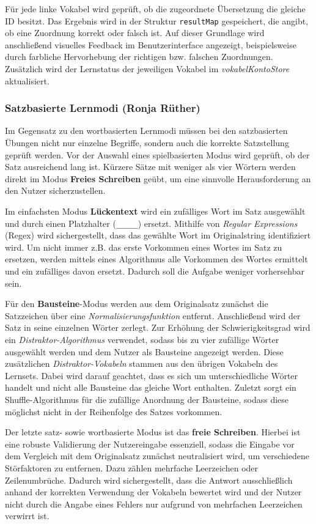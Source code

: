 Für jede linke Vokabel wird geprüft, ob die zugeordnete Übersetzung die gleiche ID besitzt. 
Das Ergebnis wird in der Struktur \texttt{resultMap} gespeichert, die angibt, ob eine Zuordnung korrekt oder falsch ist. 
Auf dieser Grundlage wird anschließend visuelles Feedback im Benutzerinterface angezeigt, beispielsweise durch farbliche Hervorhebung der richtigen bzw. falschen Zuordnungen.
Zusätzlich wird der Lernstatus der jeweiligen Vokabel im \textit{vokabelKontoStore} aktualisiert. 

\subsubsection{Satzbasierte Lernmodi (Ronja Rüther)}
Im Gegensatz zu den wortbasierten Lernmodi müssen bei den satzbasierten Übungen nicht nur einzelne Begriffe, sondern auch die korrekte Satzstellung geprüft werden.
Vor der Auswahl eines spielbasierten Modus wird geprüft, ob der Satz ausreichend lang ist. Kürzere Sätze mit weniger als vier Wörtern werden direkt im Modus \textbf{Freies Schreiben} geübt, um eine sinnvolle Herausforderung an den Nutzer sicherzustellen.

Im einfachsten Modus \textbf{Lückentext} wird ein zufälliges Wort im Satz ausgewählt und durch einen Platzhalter (\texttt{\_\_\_\_\_}) ersetzt.
Mithilfe von \textit{Regular Expressions} (Regex) wird sichergestellt, dass das gewählte Wort im Originalstring identifiziert wird. Um nicht immer z.B. das erste Vorkommen eines Wortes im Satz 
zu ersetzen, werden mittels eines Algorithmus alle Vorkommen des Wortes ermittelt und ein zufälliges davon ersetzt. Dadurch soll die Aufgabe weniger vorhersehbar sein.

Für den \textbf{Bausteine}-Modus werden aus dem Originalsatz zunächst die Satzzeichen über eine \textit{Normalisierungsfunktion} entfernt. Anschließend wird der Satz in seine einzelnen Wörter zerlegt. 
Zur Erhöhung der Schwierigkeitsgrad wird ein \textit{Distraktor-Algorithmus} verwendet, sodass bis zu vier zufällige Wörter ausgewählt werden und dem Nutzer als Bausteine angezeigt werden.
Diese zusätzlichen \textit{Distraktor-Vokabeln} stammen aus den übrigen Vokabeln des Lernsets. Dabei wird darauf geachtet, dass es sich um unterschiedliche Wörter handelt und nicht alle Bausteine das gleiche Wort enthalten.
Zuletzt sorgt ein Shuffle-Algorithmus für die zufällige Anordnung der Bausteine, sodass diese möglichst nicht in der Reihenfolge des Satzes vorkommen.

Der letzte satz- sowie wortbasierte Modus ist das \textbf{freie Schreiben}. Hierbei ist eine robuste Validierung der Nutzereingabe essenziell, sodass die Eingabe vor dem Vergleich mit dem Originalsatz 
zunächst neutralisiert wird, um verschiedene Störfaktoren zu entfernen. Dazu zählen mehrfache Leerzeichen oder Zeilenumbrüche. Dadurch wird sichergestellt, dass die Antwort ausschließlich anhand der korrekten Verwendung 
der Vokabeln bewertet wird und der Nutzer nicht durch die Angabe eines Fehlers nur aufgrund von mehrfachen Leerzeichen verwirrt ist.

